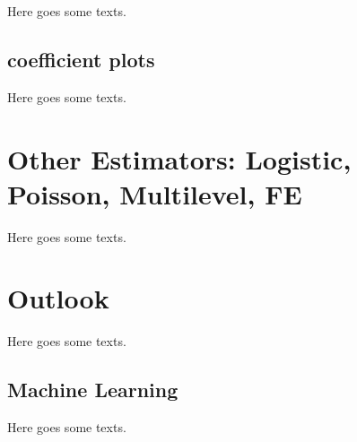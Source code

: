 \documentclass[
]{book}
\begin{document}
Here goes some texts.

\hypertarget{coefficient-plots}{%
\section{coefficient plots}\label{coefficient-plots}}

Here goes some texts.

\hypertarget{other-est}{%
\chapter{Other Estimators: Logistic, Poisson, Multilevel, FE}\label{other-est}}

Here goes some texts.

\hypertarget{out-look}{%
\chapter{Outlook}\label{out-look}}

Here goes some texts.

\hypertarget{machine-learning}{%
\section{Machine Learning}\label{machine-learning}}

Here goes some texts.

  
\end{document}
